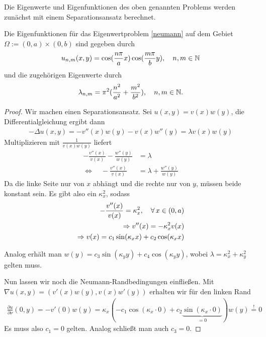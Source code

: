 \documentclass{article}
\begin{document}
Die Eigenwerte und Eigenfunktionen des oben genannten Problems werden zunächst mit einem Separationsansatz berechnet.

\begin{theorem}
	Die Eigenfunktionen für das Eigenwertproblem \ref{neumann} auf dem Gebiet $\Omega := (0,a) \times (0,b)$ sind gegeben durch
	\begin{align*}
		u_{n,m}(x,y) = \cos(\frac{n \pi}{a}x)\cos(\frac{m \pi}{b}y), \quad n,m \in \mathbb{N}
	\end{align*}
	und die zugehörigen Eigenwerte durch
	\begin{align*}
		\lambda_{n,m} = \pi^2(\frac{n^2}{a^2} + \frac{m^2}{b^2}), \quad n,m \in \mathbb{N}.
	\end{align*}
\end{theorem}

\begin{proof}
	Wir machen einen Separationsansatz. Sei $u(x,y) = v(x)w(y)$, die Differentialgleichung ergibt dann
	\begin{align*}
		- \Delta u(x,y) = -v''(x) w(y) - v(x) w''(y) = \lambda v(x)w(y)
	\end{align*}
	Multiplizieren mit $\frac{1}{v(x)w(y)}$ liefert
	\begin{align*}
		-\frac{v''(x)}{v(x)} - \frac{w''(y)}{w(y)} &= \lambda \\
		\Leftrightarrow \quad -\frac{v''(x)}{v(x)} &= \lambda + \frac{w''(y)}{w(y)}
	\end{align*}
	Da die linke Seite nur von $x$ abhängt und die rechte nur von $y$, müssen beide konstant sein. Es gibt also ein $\kappa_{x}^2$, sodass
	\begin{align*}
		-\frac{v''(x)}{v(x)} = \kappa_{x}^2, \quad \forall \, x \in (0,a) \\
		\Rightarrow v''(x) = -\kappa_{x}^2 v(x) \\
		\Rightarrow v(x) = c_1 \sin(\kappa_{x} x) + c_2 \cos(\kappa_{x} x)
	\end{align*}

	Analog erhält man $w(y) = c_3 \sin(\kappa_{y} y) + c_4 \cos(\kappa_{y} y)$, wobei $\lambda = \kappa_{x}^2 + \kappa_{y}^2$ gelten muss.

	Nun lassen wir noch die Neumann-Randbedingungen einfließen. Mit $\nabla u(x,y) = (v'(x)w(y), v(x)w'(y))$ erhalten wir für den linken Rand
	\begin{align*}
		\frac{\partial u}{\partial \nu}(0,y) = - v'(0)w(y) = \kappa_{x}(- c_1 \cos(\kappa_{x} \cdot 0) + c_2 \underbrace{\sin(\kappa_{x} \cdot 0)}_{=0})w(y) \stackrel{!}{=} 0
	\end{align*}
	Es muss also $c_1 = 0$ gelten. Analog schließt man auch $c_3 = 0$.


\end{proof}
\end{document}
